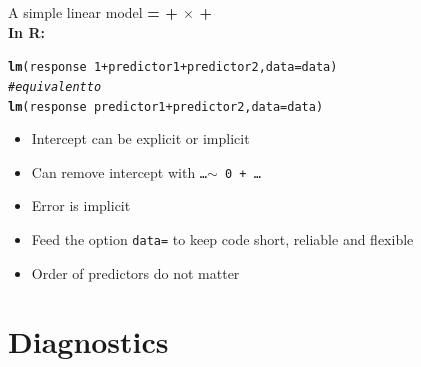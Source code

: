 \documentclass[10pt]{beamer}\usepackage[]{graphicx}\usepackage[]{color}
\makeatletter
\newcommand{\hlnum}[1]{\textcolor[rgb]{0.686,0.059,0.569}{#1}}%
\newcommand{\hlcom}[1]{\textcolor[rgb]{0.678,0.584,0.686}{\textit{#1}}}%
\newcommand{\hlopt}[1]{\textcolor[rgb]{0,0,0}{#1}}%
\newcommand{\hlstd}[1]{\textcolor[rgb]{0.345,0.345,0.345}{#1}}%
\newcommand{\hlkwc}[1]{\textcolor[rgb]{0.333,0.667,0.333}{#1}}%
\newcommand{\hlkwd}[1]{\textcolor[rgb]{0.737,0.353,0.396}{\textbf{#1}}}%
\newenvironment{kframe}{%
 \def\at@end@of@kframe{}%
 \ifinner\ifhmode%
  \def\at@end@of@kframe{\end{minipage}}%
  \begin{minipage}{\columnwidth}%
 \fi\fi%
 \def\FrameCommand##1{\hskip\@totalleftmargin \hskip-\fboxsep
 \colorbox{shadecolor}{##1}\hskip-\fboxsep
     \hskip-\linewidth \hskip-\@totalleftmargin \hskip\columnwidth}%
 \MakeFramed {\advance\hsize-\width
   \@totalleftmargin\z@ \linewidth\hsize
   \@setminipage}}%
 {\par\unskip\endMakeFramed%
 \at@end@of@kframe}
\newenvironment{knitrout}{}{} %
\makeatother
\begin{document}
\begin{frame}[fragile]{A simple linear model}
  \textbf{{\color{purple}{Response}} = {\color{blue}{Intercept}} + {\color{red}{Slope}} $\times$ {\color{orange}{Predictor}} + {\color{gray}{Error}}} \\
  \vspace{1cm}
\textbf{In R:}
\begin{knitrout}
\color{fgcolor}\begin{kframe}
\begin{alltt}
  \hlkwd{lm}\hlstd{(response} \hlopt{~} \hlnum{1} \hlopt{+} \hlstd{predictor1} \hlopt{+} \hlstd{predictor2,} \hlkwc{data}\hlstd{=data)}
    \hlcom{# equivalent to}
  \hlkwd{lm}\hlstd{(response} \hlopt{~} \hlstd{predictor1} \hlopt{+} \hlstd{predictor2,} \hlkwc{data}\hlstd{=data)}
\end{alltt}
\end{kframe}
\end{knitrout}
\begin{itemize}
  \item Intercept can be explicit or implicit
  \item Can remove intercept with \texttt{\dots $\sim $ 0 + \dots}
  \item Error is implicit
  \item Feed the option \texttt{data=} to keep code short, reliable and flexible
  \item Order of predictors do not matter 
\end{itemize}

\end{frame}

\section{Diagnostics}
\end{document}
